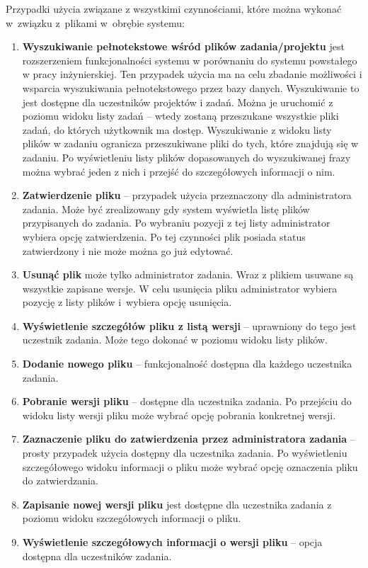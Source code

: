 Przypadki użycia związane z wszystkimi czynnościami, które można wykonać w~związku z~plikami w~obrębie systemu:
\begin{enumerate}
    \item \textbf{Wyszukiwanie pełnotekstowe wśród plików zadania/projektu} jest rozszerzeniem funkcjonalności systemu w porównaniu do systemu powstałego w pracy inżynierskiej.
    Ten przypadek użycia ma na celu zbadanie możliwości i wsparcia wyszukiwania pełnotekstowego przez bazy danych.
    Wyszukiwanie to jest dostępne dla uczestników projektów i zadań.
    Można je uruchomić z poziomu widoku listy zadań -- wtedy zostaną przeszukane wszystkie pliki zadań, do których użytkownik ma dostęp.
    Wyszukiwanie z widoku listy plików w zadaniu ogranicza przeszukiwane pliki do tych, które znajdują się w zadaniu.
    Po wyświetleniu listy plików dopasowanych do wyszukiwanej frazy można wybrać jeden z nich i przejść do szczegółowych informacji o nim.
    \item \textbf{Zatwierdzenie pliku} -- przypadek użycia przeznaczony dla administratora zadania. 
    Może być zrealizowany gdy system wyświetla listę plików przypisanych do zadania. 
    Po wybraniu pozycji z tej listy administrator wybiera opcję zatwierdzenia. 
    Po tej czynności plik posiada status zatwierdzony i nie może można go już edytować.
    \item  \textbf{Usunąć plik} może tylko administrator zadania. 
    Wraz z plikiem usuwane są wszystkie zapisane wersje. 
    W celu usunięcia pliku administrator wybiera pozycję z listy plików i~wybiera opcję usunięcia.
    \item \textbf{Wyświetlenie szczegółów pliku z listą wersji} -- uprawniony do tego jest uczestnik zadania.
    Może tego dokonać w poziomu widoku listy plików.
    \item \textbf{Dodanie nowego pliku} -- funkcjonalność dostępna dla każdego uczestnika zadania. 
    \item \textbf{Pobranie wersji pliku} -- dostępne dla uczestnika zadania. 
    Po przejściu do widoku listy wersji pliku może wybrać opcję pobrania konkretnej wersji.
    \item \textbf{Zaznaczenie pliku do zatwierdzenia przez administratora zadania} -- prosty przypadek użycia dostępny dla uczestnika zadania.
    Po wyświetleniu  szczegółowego widoku informacji o pliku może wybrać opcję oznaczenia pliku do zatwierdzania.
    \item \textbf{Zapisanie nowej wersji pliku} jest dostępne dla uczestnika zadania z poziomu widoku szczegółowych informacji o pliku.
    \item \textbf{Wyświetlenie szczegółowych informacji o wersji pliku} -- opcja dostępna dla uczestników zadania.
\end{enumerate}

